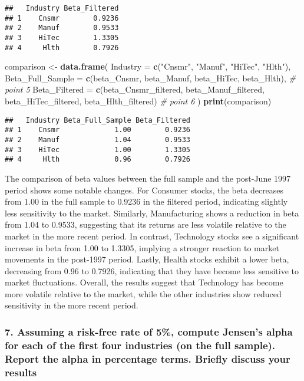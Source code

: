 \documentclass[
]{article}
\newenvironment{Shaded}{\begin{snugshade}}{\end{snugshade}}
\newcommand{\AttributeTok}[1]{\textcolor[rgb]{0.13,0.29,0.53}{#1}}
\newcommand{\CommentTok}[1]{\textcolor[rgb]{0.56,0.35,0.01}{\textit{#1}}}
\newcommand{\FunctionTok}[1]{\textcolor[rgb]{0.13,0.29,0.53}{\textbf{#1}}}
\newcommand{\NormalTok}[1]{#1}
\newcommand{\OtherTok}[1]{\textcolor[rgb]{0.56,0.35,0.01}{#1}}
\newcommand{\StringTok}[1]{\textcolor[rgb]{0.31,0.60,0.02}{#1}}
\begin{document}
\begin{verbatim}
##   Industry Beta_Filtered
## 1    Cnsmr        0.9236
## 2    Manuf        0.9533
## 3    HiTec        1.3305
## 4     Hlth        0.7926
\end{verbatim}

\begin{Shaded}
\begin{Highlighting}[]
\NormalTok{comparison }\OtherTok{\textless{}{-}} \FunctionTok{data.frame}\NormalTok{(}
  \AttributeTok{Industry =} \FunctionTok{c}\NormalTok{(}\StringTok{"Cnsmr"}\NormalTok{, }\StringTok{"Manuf"}\NormalTok{, }\StringTok{"HiTec"}\NormalTok{, }\StringTok{"Hlth"}\NormalTok{),}
  \AttributeTok{Beta\_Full\_Sample =} \FunctionTok{c}\NormalTok{(beta\_Cnsmr, beta\_Manuf, beta\_HiTec, beta\_Hlth),  }\CommentTok{\# point 5}
  \AttributeTok{Beta\_Filtered =} \FunctionTok{c}\NormalTok{(beta\_Cnsmr\_filtered, beta\_Manuf\_filtered, beta\_HiTec\_filtered, beta\_Hlth\_filtered)  }\CommentTok{\# point 6}
\NormalTok{)}
\FunctionTok{print}\NormalTok{(comparison)}
\end{Highlighting}
\end{Shaded}

\begin{verbatim}
##   Industry Beta_Full_Sample Beta_Filtered
## 1    Cnsmr             1.00        0.9236
## 2    Manuf             1.04        0.9533
## 3    HiTec             1.00        1.3305
## 4     Hlth             0.96        0.7926
\end{verbatim}

The comparison of beta values between the full sample and the post-June
1997 period shows some notable changes. For Consumer stocks, the beta
decreases from 1.00 in the full sample to 0.9236 in the filtered period,
indicating slightly less sensitivity to the market. Similarly,
Manufacturing shows a reduction in beta from 1.04 to 0.9533, suggesting
that its returns are less volatile relative to the market in the more
recent period. In contrast, Technology stocks see a significant increase
in beta from 1.00 to 1.3305, implying a stronger reaction to market
movements in the post-1997 period. Lastly, Health stocks exhibit a lower
beta, decreasing from 0.96 to 0.7926, indicating that they have become
less sensitive to market fluctuations. Overall, the results suggest that
Technology has become more volatile relative to the market, while the
other industries show reduced sensitivity in the more recent period.

\hypertarget{assuming-a-risk-free-rate-of-5-compute-jensens-alpha-for-each-of-the-first-four-industries-on-the-full-sample.-report-the-alpha-in-percentage-terms.-briefly-discuss-your-results}{%
\subsubsection{7. Assuming a risk-free rate of 5\%, compute Jensen's
alpha for each of the first four industries (on the full sample). Report
the alpha in percentage terms. Briefly discuss your
results}\label{assuming-a-risk-free-rate-of-5-compute-jensens-alpha-for-each-of-the-first-four-industries-on-the-full-sample.-report-the-alpha-in-percentage-terms.-briefly-discuss-your-results}}
\end{document}
